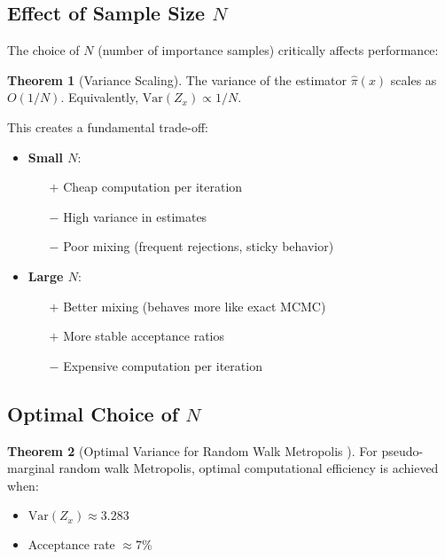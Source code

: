 \documentclass[11pt]{article}
\theoremstyle{definition}
\newtheorem{theorem}{Theorem}
\begin{document}
\subsection{Effect of Sample Size $N$}

The choice of $N$ (number of importance samples) critically affects performance:

\begin{theorem}[Variance Scaling]
The variance of the estimator $\hat{\pi}(x)$ scales as $O(1/N)$. Equivalently, $\text{Var}(Z_x) \propto 1/N$.
\end{theorem}

This creates a fundamental trade-off:

\begin{itemize}
\item \textbf{Small $N$}: 
    \begin{itemize}
    \item[$+$] Cheap computation per iteration
    \item[$-$] High variance in estimates
    \item[$-$] Poor mixing (frequent rejections, sticky behavior)
    \end{itemize}
\item \textbf{Large $N$}:
    \begin{itemize}
    \item[$+$] Better mixing (behaves more like exact MCMC)
    \item[$+$] More stable acceptance ratios
    \item[$-$] Expensive computation per iteration
    \end{itemize}
\end{itemize}

\subsection{Optimal Choice of $N$}

\begin{theorem}[Optimal Variance for Random Walk Metropolis \cite{sherlock2015}]
For pseudo-marginal random walk Metropolis, optimal computational efficiency is achieved when:
\begin{itemize}
\item $\text{Var}(Z_x) \approx 3.283$
\item Acceptance rate $\approx 7\%$
\end{itemize}
\end{theorem}
\end{document}
